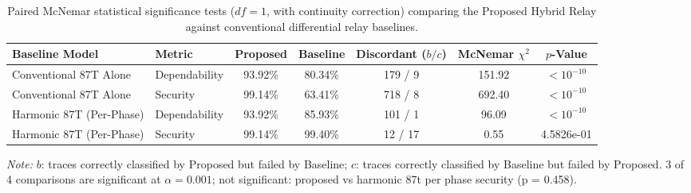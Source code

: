 \begin{table}[H]\centering
\caption{Paired McNemar statistical significance tests ($df=1$, with continuity correction) comparing the Proposed Hybrid Relay against conventional differential relay baselines.}\label{tab:6.3_stats}
\small
\begin{tabular}{@{}llccccc@{}}\toprule
\textbf{Baseline Model} & \textbf{Metric} & \textbf{Proposed} & \textbf{Baseline} & \textbf{Discordant ($b/c$)} & \textbf{McNemar $\chi^2$} & \textbf{$p$-Value}\\ \midrule
Conventional 87T Alone & Dependability & 93.92\% & 80.34\% & 179 / 9 & 151.92 & $< 10^{-10}$\\
Conventional 87T Alone & Security & 99.14\% & 63.41\% & 718 / 8 & 692.40 & $< 10^{-10}$\\
\midrule
Harmonic 87T (Per-Phase) & Dependability & 93.92\% & 85.93\% & 101 / 1 & 96.09 & $< 10^{-10}$\\
Harmonic 87T (Per-Phase) & Security & 99.14\% & 99.40\% & 12 / 17 & 0.55 & 4.5826e-01\\
\bottomrule
\end{tabular}
\vspace{3pt}\raggedright\footnotesize\textit{Note:} $b$: traces correctly classified by Proposed but failed by Baseline; $c$: traces correctly classified by Baseline but failed by Proposed. 3 of 4 comparisons are significant at $\alpha = 0.001$; not significant: proposed vs harmonic 87t per phase security (p = 0.458).
\end{table}